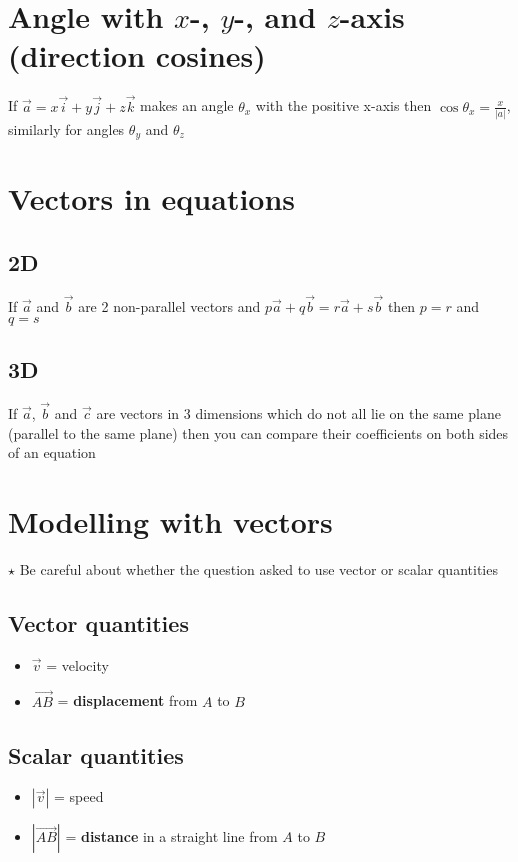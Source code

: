 \section{Angle with $x$-, $y$-, and $z$-axis (direction cosines)}
If $\vec{a}=x\vec{i}+y\vec{j}+z\vec{k}$ makes an angle $\theta_x$ with the positive x-axis then $\cos \theta_x=\frac{x}{|a|}$, similarly for angles $\theta_y$ and $\theta_z$

\section{Vectors in equations}
\subsection{2D}
If $\vec{a}$ and $\vec{b}$ are 2 non-parallel vectors and $p\vec{a}+q\vec{b}=r\vec{a}+s\vec{b}$ then $p=r$ and $q=s$

\subsection{3D}
If $\vec{a}$, $\vec{b}$ and $\vec{c}$ are vectors in 3 dimensions which do not all lie on the same plane (parallel to the same plane) then you can compare their coefficients on both sides of an equation

\section{Modelling with vectors}
$\star$ Be careful about whether the question asked to use vector or scalar quantities
\subsection{Vector quantities}
\begin{itemize}
    \item $\vec{v}$ = velocity
    \item $\overrightarrow{AB}$ = \textbf{displacement} from $A$ to $B$
\end{itemize}

\subsection{Scalar quantities}
\begin{itemize}
    \item $|\vec{v}|$ = speed
    \item $|\overrightarrow{AB}|$ = \textbf{distance} in a straight line from $A$ to $B$
\end{itemize}